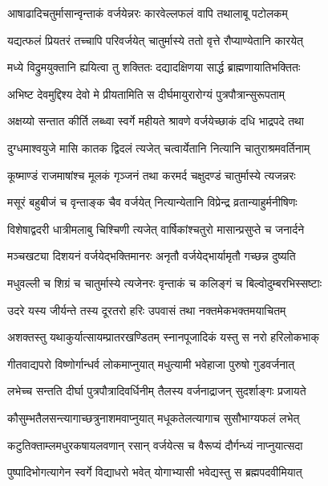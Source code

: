 \twolineshloka
{आषाढादिचतुर्मासान्वृन्ताकं वर्जयेन्नरः}
{कारवेल्लफलं वापि तथालाबू पटोलकम्} %

\twolineshloka
{यद्यत्फलं प्रियतरं तच्चापि परिवर्जयेत्}
{चातुर्मास्ये ततो वृत्ते रौप्याण्येतानि कारयेत्} %

\twolineshloka
{मध्ये विद्रुमयुक्तानि ह्ययित्वा तु शक्तितः}
{दद्यादक्षिणया सार्द्ध ब्राह्मणायातिभक्तितः} %

\twolineshloka
{अभिष्ट देवमुद्दिश्य देवो मे प्रीयतामिति}
{स दीर्घमायुरारोग्यं पुत्रपौत्रान्सुरूपताम्} %

\twolineshloka
{अक्षय्यो सन्तात कीर्ति लब्ध्वा स्वर्गे महीयते}
{श्रावणे वर्जयेच्छाकं दधि भाद्रपदे तथा} %

\twolineshloka
{दुग्धमाश्वयुजे मासि कातक द्विदलं त्यजेत्}
{चत्वार्येतानि नित्यानि चातुराश्रमवर्तिनाम्} %

\twolineshloka
{कूष्माण्डं राजमाषांश्च मूलकं गृञ्जनं तथा}
{करमर्द चक्षुदण्डं चातुर्मास्ये त्यजन्नरः} %

\twolineshloka
{मसूरं बहुबीजं च वृन्ताङ्क चैव वर्जयेत्}
{नित्यान्येतानि विप्रेन्द्र व्रतान्याहुर्मनीषिणः} %

\twolineshloka
{विशेषाद्वदरी धात्रीमलाबु चिश्चिणी त्यजेत्}
{वार्षिकांश्चतुरो मासान्प्रसुप्ते च जनार्दने} %

\twolineshloka
{मञ्चखट्या दिशयनं वर्जयेद्भक्तिमानरः}
{अनृतौ वर्जयेद्भार्यामृतौ गच्छन्न दुष्यति} %

\twolineshloka
{मधुवल्ली च शिग्रं च चातुर्मास्ये त्यजेनरः}
{वृन्ताकं च कलिङ्गं च बिल्वोदुम्बरभिस्सष्टाः} %

\twolineshloka
{उदरे यस्य जीर्यन्ते तस्य दूरतरो हरिः}
{उपवासं तथा नक्तमेकभक्तमयाचितम्} %

\twolineshloka
{अशक्तस्तु यथाकुर्यात्सायम्प्रातरखण्डितम्}
{स्नानपूजादिकं यस्तु स नरो हरिलोकभाक्} %

\twolineshloka
{गीतवाद्यपरो विष्णोर्गान्धर्व लोकमाप्नुयात्}
{मधुत्यामी भवेहाजा पुरुषो गुडवर्जनात्} %

\twolineshloka
{लभेच्च सन्तति दीर्घा पुत्रपौत्रादिवर्धिनीम्}
{तैलस्य वर्जनाद्राजन् सुदर्शाङ्गः प्रजायते} %

\twolineshloka
{कौसुम्भतैलसन्त्यागाच्छत्रुनाशमवाप्नुयात्}
{मधूकतेलत्यागाच सुसौभाग्यफलं लभेत्} %

\twolineshloka
{कटुतिक्ताम्लमधुरकषायलवणान् रसान्}
{वर्जयेत्स च वैरूप्यं दौर्गन्ध्यं नाप्नुयात्सदा} %

\twolineshloka
{पुष्पादिभोगत्यागेन स्वर्गे विद्याधरो भवेत्}
{योगाभ्यासी भवेद्यस्तु स ब्रह्मपदवीमियात्} %

